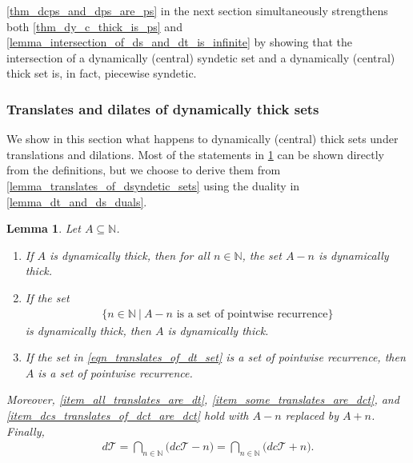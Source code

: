 \documentclass[letter,11pt]{article}
\theoremstyle{plain}
\newtheorem{lemma}[theorem]{Lemma}
\theoremstyle{definition}
\theoremstyle{plain}
\theoremstyle{plain}
\numberwithin{equation}{section}
\newcommand{\N}{\mathbb{N}}
\newcommand{\dthick}{d\mathcal{T}}
\newcommand{\dcthick}{dc\mathcal{T}}
\begin{document}
\cref{thm_dcps_and_dps_are_ps} in the next section simultaneously strengthens both \cref{thm_dy_c_thick_is_ps} and \cref{lemma_intersection_of_ds_and_dt_is_infinite} by showing that the intersection of a dynamically (central) syndetic set and a dynamically (central) thick set is, in fact, piecewise syndetic.

\subsubsection{Translates and dilates of dynamically thick sets}

We show in this section what happens to dynamically (central) thick sets under translations and dilations.  Most of the statements in \cref{lemma_translates_of_dthick_sets} can be shown directly from the definitions, but we choose to derive them from \cref{lemma_translates_of_dsyndetic_sets} using the duality in \cref{lemma_dt_and_ds_duals}.

\begin{lemma}
\label{lemma_translates_of_dthick_sets}
    Let $A \subseteq \N$.
    \begin{enumerate}
        \item
        \label{item_all_translates_are_dt}
        If $A$ is dynamically thick, then for all $n \in \N$, the set $A-n$ is dynamically thick.
        
        \item
        \label{item_some_translates_are_dct}
        If the set
        \begin{align}
            \label{eqn_translates_of_dt_set}
            \big\{ n \in \N \ \big| \ A-n \text{ is a set of pointwise recurrence} \big\}
        \end{align}
        is dynamically thick, then $A$ is dynamically thick.
        
        \item
        \label{item_dcs_translates_of_dct_are_dct}
        If the set in \eqref{eqn_translates_of_dt_set} is a set of pointwise recurrence, then $A$ is a set of pointwise recurrence.
    \end{enumerate}
    Moreover, \eqref{item_all_translates_are_dt}, \eqref{item_some_translates_are_dct}, and \eqref{item_dcs_translates_of_dct_are_dct} hold with $A-n$ replaced by $A+n$. Finally,
    \begin{align}
        \label{eqn_relationship_between_dt_and_dct_classes}
        \dthick = \bigcap_{n \in \N} \big(\dcthick - n \big) = \bigcap_{n \in \N} \big(\dcthick + n \big).
    \end{align}
\end{lemma}
\end{document}

